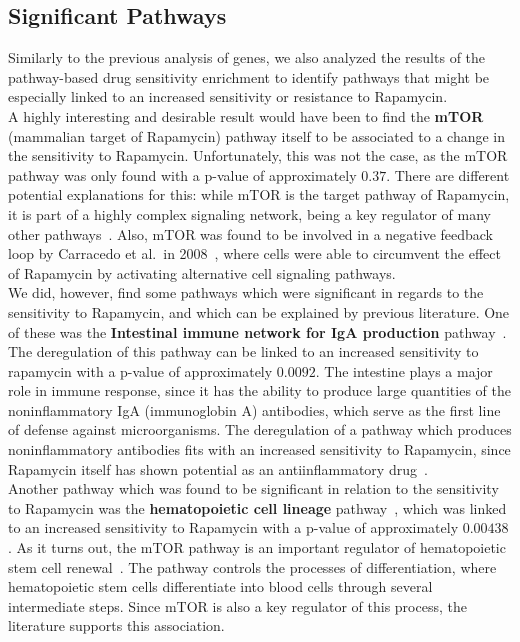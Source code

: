 \subsection{Significant Pathways}\label{subsec:rapamycin_pathways}
Similarly to the previous analysis of genes, we also analyzed the results of the pathway-based drug sensitivity enrichment to identify pathways that might be especially linked to an increased sensitivity or resistance to Rapamycin.\\
A highly interesting and desirable result would have been to find the \textbf{mTOR} (mammalian target of Rapamycin) pathway itself to be associated to a change in the sensitivity to Rapamycin. Unfortunately, this was not the case, as the mTOR pathway was only found with a p-value of approximately $0.37$. There are different potential explanations for this: while mTOR is the target pathway of Rapamycin, it is part of a highly complex signaling network, being a key regulator of many other pathways~\cite{rapamycin_multi_faceted}. Also, mTOR was found to be involved in a negative feedback loop by Carracedo et al.\ in 2008~\cite{mTOR_negative_feedback_loop}, where cells were able to circumvent the effect of Rapamycin by activating alternative cell signaling pathways.\\
We did, however, find some pathways which were significant in regards to the sensitivity to Rapamycin, and which can be explained by previous literature. One of these was the \textbf{Intestinal immune network for IgA production} pathway~\cite{kegg_iga}. The deregulation of this pathway can be linked to an increased sensitivity to rapamycin with a p-value of approximately $0.0092$. The intestine plays a major role in immune response, since it has the ability to produce large quantities of the noninflammatory IgA (immunoglobin A) antibodies, which serve as the first line of defense against microorganisms. The deregulation of a pathway which produces noninflammatory antibodies fits with an increased sensitivity to Rapamycin, since Rapamycin itself has shown potential as an antiinflammatory drug~\cite{rapamycin_multi_faceted}.\\
Another pathway which was found to be significant in relation to the sensitivity to Rapamycin was the \textbf{hematopoietic cell lineage} pathway~\cite{kegg_hematopoietic_cell_lineage}, which was linked to an increased sensitivity to Rapamycin with a p-value of approximately $0.00438$. As it turns out, the mTOR pathway is an important regulator of hematopoietic stem cell renewal~\cite{mtor_hematopoietic}. The pathway controls the processes of differentiation, where hematopoietic stem cells differentiate into blood cells through several intermediate steps. Since mTOR is also a key regulator of this process, the literature supports this association.\\
